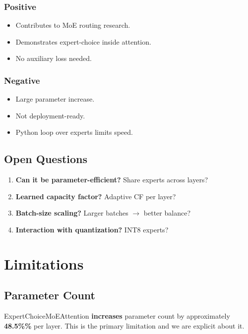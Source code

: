 \subsubsection{Positive}
\begin{itemize}
\item Contributes to MoE routing research.
\item Demonstrates expert-choice inside attention.
\item No auxiliary loss needed.

\end{itemize}
\subsubsection{Negative}
\begin{itemize}
\item Large parameter increase.
\item Not deployment-ready.
\item Python loop over experts limits speed.

\end{itemize}
\subsection{Open Questions}

\begin{enumerate}
\item \textbf{Can it be parameter-efficient?} Share experts across layers?
\item \textbf{Learned capacity factor?} Adaptive CF per layer?
\item \textbf{Batch-size scaling?} Larger batches $\to$ better balance?
\item \textbf{Interaction with quantization?} INT8 experts?

\end{enumerate}


\section{Limitations}

\subsection{Parameter Count}

ExpertChoiceMoEAttention \textbf{increases} parameter count by approximately 
\textbf{48.5\%\%} per layer. This is the primary limitation and we are 
explicit about it.

